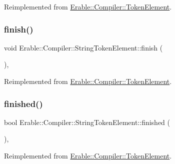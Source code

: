 Reimplemented from \mbox{\hyperlink{class_erable_1_1_compiler_1_1_token_element_a36d20884e5ba6cfa46fcd28711be9589}{Erable\+::\+Compiler\+::\+Token\+Element}}.

\mbox{\label{class_erable_1_1_compiler_1_1_string_token_element_acf6ab613a09eb8220be24a83d3e28490}} 
\subsubsection{\texorpdfstring{finish()}{finish()}}
{\footnotesize\ttfamily void Erable\+::\+Compiler\+::\+String\+Token\+Element\+::finish (\begin{DoxyParamCaption}{ }\end{DoxyParamCaption})\hspace{0.3cm}{\ttfamily [override]}, {\ttfamily [virtual]}}



Reimplemented from \mbox{\hyperlink{class_erable_1_1_compiler_1_1_token_element_a481e4deb721a1a5f435ee27f850cdf81}{Erable\+::\+Compiler\+::\+Token\+Element}}.

\mbox{\label{class_erable_1_1_compiler_1_1_string_token_element_a0fa477d39992b60c916c083ea90f1526}} 
\subsubsection{\texorpdfstring{finished()}{finished()}}
{\footnotesize\ttfamily bool Erable\+::\+Compiler\+::\+String\+Token\+Element\+::finished (\begin{DoxyParamCaption}{ }\end{DoxyParamCaption})\hspace{0.3cm}{\ttfamily [override]}, {\ttfamily [virtual]}}



Reimplemented from \mbox{\hyperlink{class_erable_1_1_compiler_1_1_token_element_a1ff3e31b4064cd22463c91130a819646}{Erable\+::\+Compiler\+::\+Token\+Element}}.

